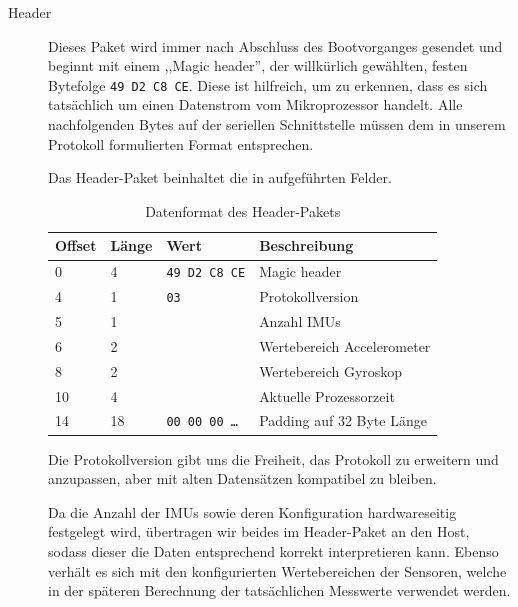 \begin{description}
    \item[Header] Dieses Paket wird immer nach Abschluss des Bootvorganges
        gesendet und beginnt mit einem ,,Magic header'', der willkürlich
        gewählten, festen Bytefolge \texttt{49 D2 C8 CE}. Diese ist hilfreich,
        um zu erkennen, dass es sich tatsächlich um einen Datenstrom vom
        Mikroprozessor handelt. Alle nachfolgenden Bytes auf der seriellen
        Schnittstelle müssen dem in unserem Protokoll formulierten Format
        entsprechen.

        Das Header-Paket beinhaltet die in 
        aufgeführten Felder.

        \begin{table}[h]
            \centering
            \begin{tabular}{@{}llll@{}}
                \toprule
                Offset & Länge & Wert & Beschreibung \\ \midrule
                0   & 4 & \texttt{49 D2 C8 CE} & Magic header \\
                4   & 1 & \texttt{03} & Protokollversion \\
                5   & 1 & & Anzahl IMUs \\
                6   & 2 & & Wertebereich Accelerometer \\
                8   & 2 & & Wertebereich Gyroskop \\
                10  & 4 & & Aktuelle Prozessorzeit \\
                14  & 18 & \texttt{00 00 00 \ldots} & Padding auf 32 Byte Länge \\
                \bottomrule
            \end{tabular}
            \caption{Datenformat des Header-Pakets}
        \end{table}

        Die Protokollversion gibt uns die Freiheit, das Protokoll zu erweitern
        und anzupassen, aber mit alten Datensätzen kompatibel zu bleiben.

        Da die Anzahl der IMUs sowie deren Konfiguration hardwareseitig
        festgelegt wird, übertragen wir beides im Header-Paket an den Host,
        sodass dieser die Daten entsprechend korrekt interpretieren kann.
        Ebenso verhält es sich mit den konfigurierten Wertebereichen der
        Sensoren, welche in der späteren Berechnung der tatsächlichen Messwerte
        verwendet werden.
\end{description}

